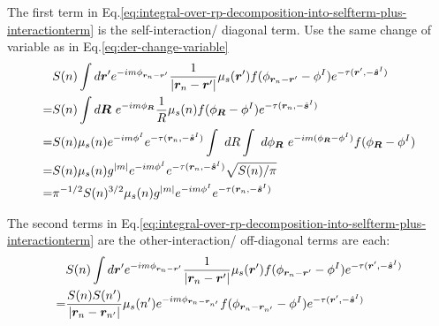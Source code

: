\documentclass [10pt,letterpaper]{article}
\newcommand{\unitvectorsym}[1]{\hat{\vectorsym{#1}}}
\begin{document}
The first term in Eq.\eqref{eq:integral-over-rp-decomposition-into-selfterm-plus-interactionterm} is the self-interaction/ diagonal term. Use the same change of variable as in Eq.\eqref{eq:der-change-variable}
\begin{equation} \label{eq:result-diagonal-Vscnm-1pt}
	\begin{split} 
		&
		S(n)
		\int d\vectorsym{r}^\prime
		e^{-i m \phi_{\vectorsym{r}_n-\vectorsym{r}^\prime}}
		\frac
		{1}
		{\lvert \vectorsym{r}_n-\vectorsym{r}^\prime \rvert}
		\mu_s(\vectorsym{r}^\prime)
		f(\phi_{\vectorsym{r}_n-\vectorsym{r}^\prime}-\phi^I)
		e^{-\tau(\vectorsym{r}^\prime,-\unitvectorsym{s}^I)} 
		\\
		=& 
		S(n)
		\int d\vectorsym{R}
		\ e^{-i m \phi_{\vectorsym{R}} }
		\frac
		{1}
		R
		\mu_s(n)
		f(\phi_{\vectorsym{R}}-\phi^I)
		e^{-\tau(\vectorsym{r}_n,-\unitvectorsym{s}^I)} 
		\\
		=& 
		S(n)
		\mu_s(n)
		e^{-i m \phi^I }
		e^{-\tau(\vectorsym{r}_n,-\unitvectorsym{s}^I)} 
		\int \ dR
		\int \ d\phi_{\vectorsym{R}}
		\ e^{-i m (\phi_{\vectorsym{R}} - \phi^I)}
		f(\phi_{\vectorsym{R}}-\phi^I)
		\\
		=& 
		S(n)
		\mu_s(n)
		g^{\lvert m \rvert}
		e^{-i m \phi^I }
		e^{-\tau(\vectorsym{r}_n,-\unitvectorsym{s}^I)} 
		\sqrt{S(n)/\pi}
		\\
		=& 
		\pi^{-1/2}
		S(n)^{3/2}
		\mu_s(n)
		g^{\lvert m \rvert}
		e^{-i m \phi^I }
		e^{-\tau(\vectorsym{r}_n,-\unitvectorsym{s}^I)} 
	\end{split}
\end{equation}

The second terms in Eq.\eqref{eq:integral-over-rp-decomposition-into-selfterm-plus-interactionterm} are the other-interaction/ off-diagonal terms are each:
\begin{equation} \label{eq:result-off-diagonal-Vscnm-1pt}
	\begin{split} 
		&
		S(n)
		\int d\vectorsym{r}^\prime
		e^{-i m \phi_{\vectorsym{r}_n-\vectorsym{r}^\prime}}
		\frac
		{1}
		{\lvert \vectorsym{r}_n-\vectorsym{r}^\prime \rvert}
		\mu_s(\vectorsym{r}^\prime)
		f(\phi_{\vectorsym{r}_n-\vectorsym{r}^\prime}-\phi^I)
		e^{-\tau(\vectorsym{r}^\prime,-\unitvectorsym{s}^I)} 
		\\
		=&
		\frac
		{S(n)S(n^\prime)}
		{\lvert \vectorsym{r}_n - \vectorsym{r}_{n^\prime} \rvert} 
		\mu_s(n^\prime)
		e^{-i m \phi_{\vectorsym{r}_n - \vectorsym{r}_{n^\prime}}}
		f(\phi_{\vectorsym{r}_n - \vectorsym{r}_{n^\prime}}-\phi^I)
		e^{-\tau(\vectorsym{r}^\prime,-\unitvectorsym{s}^I)}
	\end{split}
\end{equation}
\end{document}
